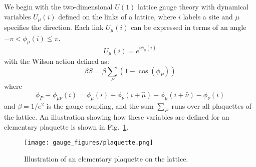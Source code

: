 \documentclass[main.tex]{subfiles}
\begin{document}
%

We begin with the two-dimensional $U{(1)}$ lattice gauge theory with dynamical variables $U_{\mu}{(i)}$
defined on the links of a lattice, where $i$ labels a site and $\mu$ specifies the direction.
%
%
Each link $U_{\mu}{(i)}$ can be expressed in terms of an angle $-\pi < \phi_{\mu}{(i)} \leq \pi$.
%
\begin{equation}
    U_{\mu}{(i)} = e^{i\phi_{\mu}{(i)}}
    \label{eq:link_variable}
\end{equation}
%
with the Wilson action defined as:
%
\begin{equation}
    \beta S = \beta \sum_{P}{(1 - \cos{(\phi_{P})})}
    \label{eq:wilson_action}
\end{equation}
%
where
%
\begin{equation}
    \phi_{P} \equiv \phi_{\mu\nu}(i) = 
        \phi_{\mu}{(i)} + \phi_{\nu}{(i + \hat{\mu})} 
        - \phi_{\mu}{(i + \hat{\nu})} - \phi_{\nu}{(i)}
    \label{eq:phi_plaquette}
\end{equation}
and $\beta = 1/e^{2}$ is the gauge coupling, and the sum $\sum_{P}$ runs over all plaquettes of the lattice.
%
An illustration showing how these variables are defined for an elementary plaquette is shown in
Fig.~\ref{fig:plaquette}.
%
\begin{figure}[htpb]
  \centering
  \texttt{[image: gauge\_figures/plaquette.png]}
  \caption{Illustration of an elementary plaquette on the lattice.}%
\label{fig:plaquette}
\end{figure}
\end{document}
